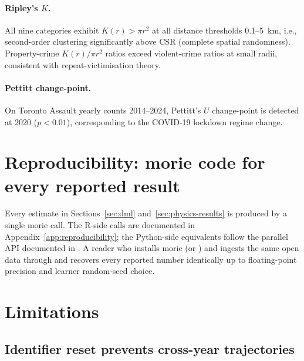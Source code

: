 \documentclass[article,shortnames,nojss]{jss}
\begin{document}
\paragraph{Ripley's $K$.}  All nine categories exhibit
$K(r)>\pi r^2$ at all distance thresholds 0.1--5~km, i.e.,
second-order clustering significantly above CSR (complete spatial
randomness).  Property-crime $K(r)/\pi r^2$ ratios exceed
violent-crime ratios at small radii, consistent with
repeat-victimisation theory.


\paragraph{Pettitt change-point.}  On Toronto Assault yearly counts
2014--2024, Pettitt's $U$ change-point is detected at 2020
($p<0.01$), corresponding to the COVID-19 lockdown regime change.



\section{Reproducibility: morie code for every reported result}
\label{sec:reproducibility}

Every estimate in Sections~\ref{sec:dml} and~\ref{sec:physics-results} is produced by a single morie call. The R-side
calls are documented in Appendix~\ref{app:reproducibility}; the
Python-side equivalents follow the parallel API documented in
\citet{Ruhela2026MoriePy}. A reader who installs morie
 (or ) and
ingests the same open data through 
and  recovers every reported number
identically up to floating-point precision and learner random-seed
choice.

\section{Limitations}
\label{sec:limitations}

\subsection{Identifier reset prevents cross-year trajectories}
\end{document}
